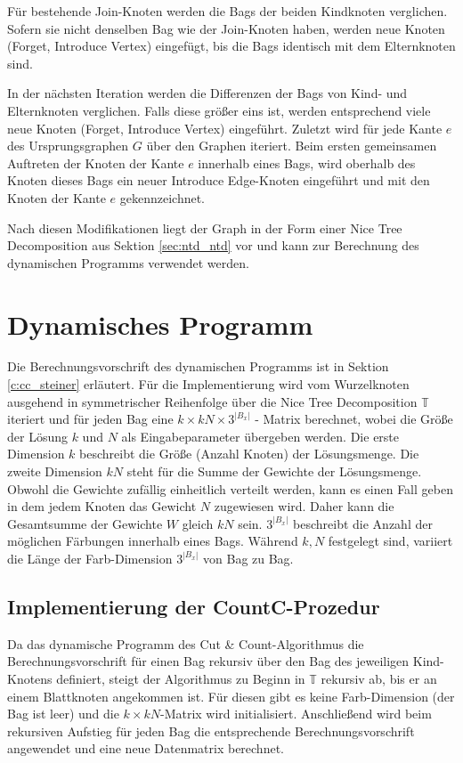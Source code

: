 Für bestehende \glqq Join\grqq -Knoten werden die Bags der beiden Kindknoten verglichen. 
Sofern sie nicht denselben Bag wie der \glqq Join\grqq -Knoten haben, werden neue Knoten (\glqq Forget\grqq , \glqq Introduce Vertex\grqq ) eingefügt, bis die Bags identisch mit dem Elternknoten sind. 

In der nächsten Iteration werden die Differenzen der Bags von Kind- und Elternknoten verglichen. 
Falls diese größer eins ist, werden entsprechend viele neue Knoten (\glqq Forget\grqq , \glqq Introduce Vertex\grqq ) eingeführt.
Zuletzt wird für jede Kante $e$ des Ursprungsgraphen $G$ über den Graphen iteriert. 
Beim ersten gemeinsamen Auftreten der Knoten der Kante $e$ innerhalb eines Bags, wird oberhalb des Knoten dieses Bags ein neuer \glqq Introduce Edge\grqq -Knoten eingeführt und mit den Knoten der Kante $e$ gekennzeichnet.

Nach diesen Modifikationen liegt der Graph in der Form einer Nice Tree Decomposition aus Sektion \ref{sec:ntd_ntd} vor und kann zur Berechnung des dynamischen Programms verwendet werden.

\section{Dynamisches Programm}
\label{sec:impl_dynP}
Die Berechnungsvorschrift des dynamischen Programms ist in Sektion \ref{c:cc_steiner} erläutert. 
Für die Implementierung wird vom Wurzelknoten ausgehend in symmetrischer Reihenfolge über die Nice Tree Decomposition $\mathbb{T}$ iteriert und für jeden Bag eine $k \times kN \times 3^{|B_x|}$ - Matrix berechnet, wobei die Größe der Lösung $k$ und $N$ als Eingabeparameter übergeben werden. 
Die erste Dimension $k$ beschreibt die Größe (Anzahl Knoten) der Lösungsmenge. 
Die zweite Dimension $kN$ steht für die Summe der Gewichte der Lösungsmenge. 
Obwohl die Gewichte zufällig einheitlich verteilt werden, kann es einen Fall geben in dem jedem Knoten das Gewicht $N$ zugewiesen wird. 
Daher kann die Gesamtsumme der Gewichte $W$ gleich $kN$ sein.
$3^{|B_x|}$ beschreibt die Anzahl der möglichen Färbungen innerhalb eines Bags. 
Während $k,N$ festgelegt sind, variiert die Länge der Farb-Dimension $3^{|B_x|}$ von Bag zu Bag.
\subsection{Implementierung der CountC-Prozedur}
\label{ssec:impl_countc}
Da das dynamische Programm des Cut \& Count-Algorithmus die Berechnungsvorschrift für einen Bag rekursiv über den Bag des jeweiligen Kind-Knotens definiert, steigt der Algorithmus zu Beginn in $\mathbb{T}$ rekursiv ab, bis er an einem Blattknoten angekommen ist. 
Für diesen gibt es keine Farb-Dimension (der Bag ist leer) und die $k \times kN$-Matrix wird initialisiert. 
Anschließend wird beim rekursiven Aufstieg für jeden Bag die entsprechende Berechnungsvorschrift angewendet und eine neue Datenmatrix berechnet. 

